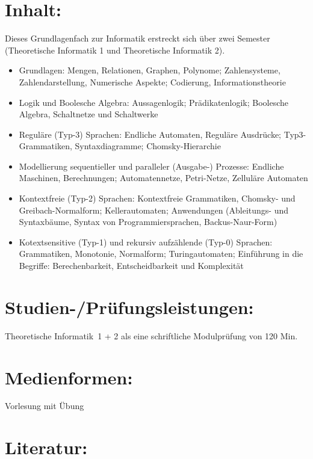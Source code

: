 \section*{Inhalt:}\label{inhalt-23}

Dieses Grundlagenfach zur Informatik erstreckt sich über zwei Semester
(Theoretische Informatik 1 und Theoretische Informatik 2).

\begin{itemize}
\item
  Grundlagen: Mengen, Relationen, Graphen, Polynome; Zahlensysteme,
  Zahlendarstellung, Numerische Aspekte; Codierung, Informationstheorie
\item
  Logik und Boolesche Algebra: Aussagenlogik; Prädikatenlogik; Boolesche
  Algebra, Schaltnetze und Schaltwerke
\item
  Reguläre (Typ-3) Sprachen: Endliche Automaten, Reguläre Ausdrücke;
  Typ3-Grammatiken, Syntaxdiagramme; Chomsky-Hierarchie
\item
  Modellierung sequentieller und paralleler (Ausgabe-) Prozesse:
  Endliche Maschinen, Berechnungen; Automatennetze, Petri-Netze,
  Zelluläre Automaten
\item
  Kontextfreie (Typ-2) Sprachen: Kontextfreie Grammatiken, Chomsky- und
  Greibach-Normalform; Kellerautomaten; Anwendungen (Ableitungs- und
  Syntaxbäume, Syntax von Programmiersprachen, Backus-Naur-Form)
\item
  Kotextsensitive (Typ-1) und rekursiv aufzählende (Typ-0) Sprachen:
  Grammatiken, Monotonie, Normalform; Turingautomaten; Einführung in die
  Begriffe: Berechenbarkeit, Entscheidbarkeit und Komplexität
\end{itemize}

\section*{Studien-/Prüfungsleistungen:}\label{studien-pruxfcfungsleistungen-21}

Theoretische Informatik~1 + 2 als eine schriftliche Modulprüfung von 120
Min.

\section*{Medienformen:}\label{medienformen-14}

Vorlesung mit Übung

\section*{Literatur:}\label{literatur-19}

